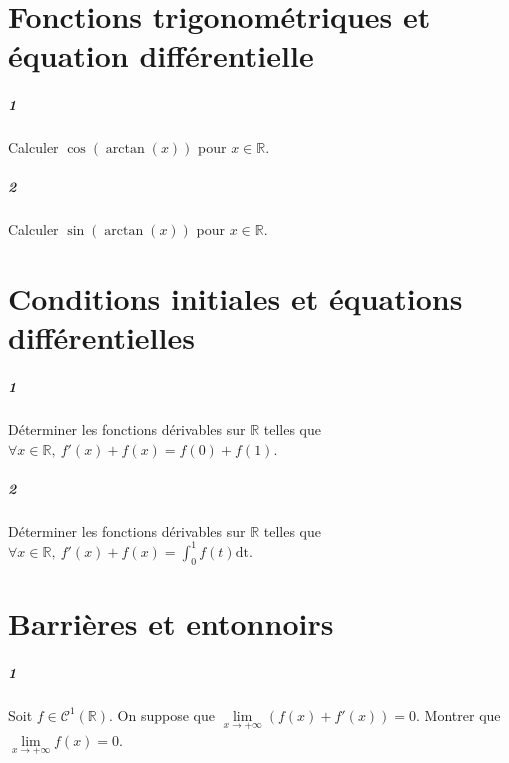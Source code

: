 \documentclass[10pt,a4paper]{article}
\begin{document}
\section{Fonctions trigonométriques et équation différentielle}
\subparagraph{1}Calculer $\cos(\arctan(x))$ pour $x \in \mathbb{R}$.
\subparagraph{2}Calculer $\sin(\arctan(x))$ pour $x \in \mathbb{R}$.

\section{Conditions initiales et équations différentielles}
\subparagraph{1}Déterminer les fonctions dérivables sur $\mathbb{R}$ telles que $\forall x \in \mathbb{R}, \ f'(x) + f(x) = f(0) + f(1)$.
\subparagraph{2}Déterminer les fonctions dérivables sur $\mathbb{R}$ telles que $\forall x \in \mathbb{R}, \ f'(x) + f(x) = \int_0^1 f(t) \text{dt}$.

\section{Barrières et entonnoirs}
\subparagraph{1}Soit $f \in \mathcal{C}^1(\mathbb{R})$. On suppose que $\underset{x \rightarrow + \infty}{\lim} \left( f(x) + f'(x) \right) = 0$. Montrer que $\underset{x \rightarrow + \infty}{\lim} f(x) = 0$.
\end{document}
